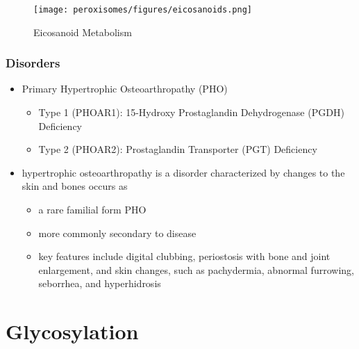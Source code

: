 \documentclass[12pt]{scrartcl}
\begin{document}
\begin{figure}[htbp]
\centering
\texttt{[image: peroxisomes/figures/eicosanoids.png]}
\caption{\label{fig:org786c9a5}Eicosanoid Metabolism}
\end{figure}

\subsubsection{Disorders}
\label{sec:orgabbe8b4}
\begin{itemize}
\item Primary Hypertrophic Osteoarthropathy (PHO)
\begin{itemize}
\item Type 1 (PHOAR1): 15-Hydroxy Prostaglandin Dehydrogenase (PGDH) Deficiency
\item Type 2 (PHOAR2): Prostaglandin Transporter (PGT) Deficiency
\end{itemize}

\item hypertrophic osteoarthropathy is a disorder characterized by changes
to the skin and bones occurs as
\begin{itemize}
\item a rare familial form PHO
\item more commonly secondary to disease
\item key features include digital clubbing, periostosis with bone and
joint enlargement, and skin changes, such as pachydermia, abnormal
furrowing, seborrhea, and hyperhidrosis
\end{itemize}
\end{itemize}
\section{Glycosylation}
\label{sec:org16a4e24}
\end{document}
